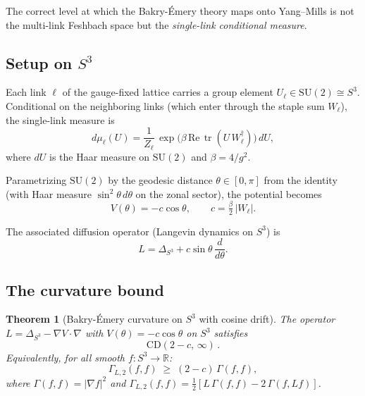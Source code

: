 \documentclass[11pt,a4paper]{article}
\theoremstyle{plain}
\newtheorem{theorem}{Theorem}
\theoremstyle{definition}
\theoremstyle{remark}
\newcommand{\R}{\mathbb{R}}
\newcommand{\tr}{\operatorname{tr}}
\begin{document}
The correct level at which the Bakry-\'{E}mery theory maps onto
Yang--Mills is not the multi-link Feshbach space but the
\emph{single-link conditional measure}.

\subsection{Setup on $S^3$}

Each link $\ell$ of the gauge-fixed lattice carries a group element
$U_\ell \in \mathrm{SU}(2) \cong S^3$.  Conditional on the neighboring
links (which enter through the staple sum $W_\ell$), the single-link
measure is
\begin{equation}
  d\mu_\ell(U) = \frac{1}{Z_\ell}\,
  \exp\!\bigl(\beta\,\mathrm{Re}\,\tr(U\,W_\ell^\dag)\bigr)\,dU,
\end{equation}
where $dU$ is the Haar measure on $\mathrm{SU}(2)$ and
$\beta = 4/g^2$.

Parametrizing $\mathrm{SU}(2)$ by the geodesic distance $\theta \in
[0,\pi]$ from the identity (with Haar measure $\sin^2\theta\,d\theta$
on the zonal sector), the potential becomes
\begin{equation}
  V(\theta) = -c\cos\theta, \qquad c = \tfrac{\beta}{2}\,|W_\ell|.
\end{equation}

The associated diffusion operator (Langevin dynamics on $S^3$) is
\begin{equation}
  L = \Delta_{S^3} + c\sin\theta\,\frac{d}{d\theta}.
\end{equation}

\subsection{The curvature bound}

\begin{theorem}[Bakry-\'{E}mery curvature on $S^3$ with cosine drift]%
\label{thm:S3}
The operator $L = \Delta_{S^3} - \nabla V \cdot \nabla$ with $V(\theta)
= -c\cos\theta$ on $S^3$ satisfies
\begin{equation}
  \boxed{\mathrm{CD}(2-c,\,\infty)}\,.
\end{equation}
Equivalently, for all smooth $f \colon S^3 \to \R$:
\begin{equation}\label{eq:CD-S3}
  \Gamma_{L,2}(f,f) \;\ge\; (2-c)\,\Gamma(f,f),
\end{equation}
where $\Gamma(f,f) = |\nabla f|^2$ and $\Gamma_{L,2}(f,f) =
\tfrac{1}{2}[L\,\Gamma(f,f) - 2\,\Gamma(f,Lf)]$.
\end{theorem}
\end{document}
